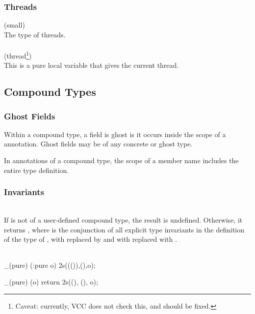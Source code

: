 \documentclass[preprint,nocopyrightspace]{sigplanconf}
\begin{document}
{{{\subsubsection{Threads}
\vcc{\thread} (small) \\
The type of threads. 
\\\\
 (thread\footnote{Caveat: currently, VCC does
not check this, and should be fixed.})\\
This is a pure local variable that gives the current
thread. 

\subsection{Compound Types}
 
\subsubsection{Ghost Fields}
Within a compound type, a field is ghost is it occurs inside the scope
of a   annotation. Ghost fields may be of any concrete
or ghost type. 

In annotations of a compound type, the scope of a member name includes
the entire type definition.

\subsubsection{Invariants}

\\
If  is not of a user-defined compound type, the result is 
undefined. Otherwise, it returns , where 
is the conjunction of all explicit 
type invariants in the definition of the type of ,
with  replaced by  and
with \vcc{\this} replaced with .
\\\\
\begin{VCC}
_(pure) \bool {}(:pure \object o)
{ \return \inv2s(\old(\now()),\now(),o); }
\end{VCC}

\begin{VCC}
_(pure) \bool \inv(\object o)
{ return \inv2s(\now(), \now(), o); }
\end{VCC}

}}}
\end{document}
